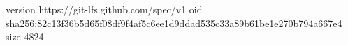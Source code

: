 version https://git-lfs.github.com/spec/v1
oid sha256:82c13f36b5d65f08df9f4af5c6ee1d9ddad535c33a89b61be1e270b794a667e4
size 4824
